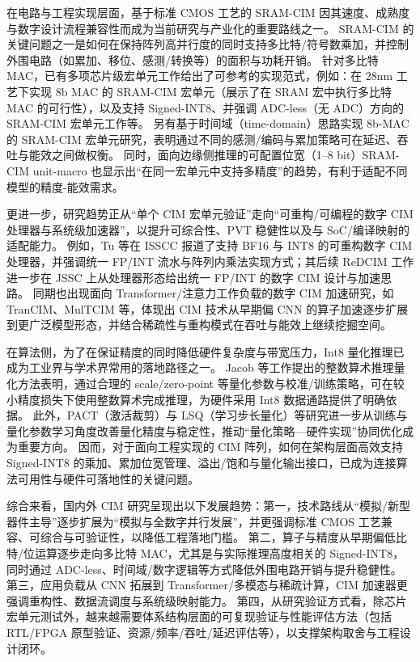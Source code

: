 \documentclass[12pt, a4paper]{article}
\begin{document}
在电路与工程实现层面，基于标准 CMOS 工艺的 SRAM-CIM 因其速度、成熟度与数字设计流程兼容性而成为当前研究与产业化的重要路线之一。\cite{5}\cite{12}\cite{14} SRAM-CIM 的关键问题之一是如何在保持阵列高并行度的同时支持多比特/符号数乘加，并控制外围电路（如累加、移位、感测/转换等）的面积与功耗开销。\cite{5}\cite{12} 针对多比特 MAC，已有多项芯片级宏单元工作给出了可参考的实现范式，例如：在 28nm 工艺下实现 8b MAC 的 SRAM-CIM 宏单元（展示了在 SRAM 宏中执行多比特 MAC 的可行性），以及支持 Signed-INT8、并强调 ADC-less（无 ADC）方向的 SRAM-CIM 宏单元工作等。\cite{8} 另有基于时间域（time-domain）思路实现 8b-MAC 的 SRAM-CIM 宏单元研究，表明通过不同的感测/编码与累加策略可在延迟、吞吐与能效之间做权衡。 同时，面向边缘侧推理的可配置位宽（1–8 bit）SRAM-CIM unit-macro 也显示出“在同一宏单元中支持多精度”的趋势，有利于适配不同模型的精度-能效需求。\cite{23}


更进一步，研究趋势正从“单个 CIM 宏单元验证”走向“可重构/可编程的数字 CIM 处理器与系统级加速器”，以提升可综合性、PVT 稳健性以及与 SoC/编译映射的适配能力。\cite{12}\cite{14}\cite{24}\cite{25} 例如，Tu 等在 ISSCC 报道了支持 BF16 与 INT8 的可重构数字 CIM 处理器，并强调统一 FP/INT 流水与阵列内乘法实现方式；其后续 ReDCIM 工作进一步在 JSSC 上从处理器形态给出统一 FP/INT 的数字 CIM 设计与加速思路。\cite{24}\cite{25} 同期也出现面向 Transformer/注意力工作负载的数字 CIM 加速研究，如 TranCIM、MulTCIM 等，体现出 CIM 技术从早期偏 CNN 的算子加速逐步扩展到更广泛模型形态，并结合稀疏性与重构模式在吞吐与能效上继续挖掘空间。\cite{26}\cite{27}


在算法侧，为了在保证精度的同时降低硬件复杂度与带宽压力，Int8 量化推理已成为工业界与学术界常用的落地路径之一。\cite{6} Jacob 等工作提出的整数算术推理量化方法表明，通过合理的 scale/zero-point 等量化参数与校准/训练策略，可在较小精度损失下使用整数算术完成推理，为硬件采用 Int8 数据通路提供了明确依据。\cite{6} 此外，PACT（激活裁剪）与 LSQ（学习步长量化）等研究进一步从训练与量化参数学习角度改善量化精度与稳定性，推动“量化策略—硬件实现”协同优化成为重要方向。\cite{28}\cite{29} 因而，对于面向工程实现的 CIM 阵列，如何在架构层面高效支持 Signed-INT8 的乘加、累加位宽管理、溢出/饱和与量化输出接口，已成为连接算法可用性与硬件可落地性的关键问题。\cite{5}\cite{6}\cite{12}


综合来看，国内外 CIM 研究呈现出以下发展趋势：第一，技术路线从“模拟/新型器件主导”逐步扩展为“模拟与全数字并行发展”，并更强调标准 CMOS 工艺兼容、可综合与可验证性，以降低工程落地门槛。\cite{4}\cite{12}\cite{14}\cite{24} 第二，算子与精度从早期偏低比特/位运算逐步走向多比特 MAC，尤其是与实际推理高度相关的 Signed-INT8，同时通过 ADC-less、时间域/数字逻辑等方式降低外围电路开销与提升稳健性。\cite{8}\cite{9}\cite{12}\cite{23} 第三，应用负载从 CNN 拓展到 Transformer/多模态与稀疏计算，CIM 加速器更强调重构性、数据流调度与系统级映射能力。\cite{26}\cite{27} 第四，从研究验证方式看，除芯片宏单元测试外，越来越需要体系结构层面的可复现验证与性能评估方法（包括 RTL/FPGA 原型验证、资源/频率/吞吐/延迟评估等），以支撑架构取舍与工程设计闭环。\cite{12}\cite{16}
\end{document}
